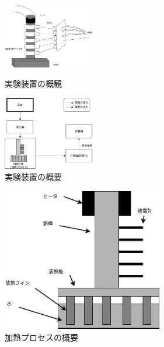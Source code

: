 \documentclass[12pt]{jsarticle}
\begin{document}
\begin{figure}[htbp]
 \begin{minipage}{0.5\hsize}
  \begin{center}
    \includegraphics[clip,width=4.0cm]{../Img/FigB1.eps}
  \end{center}
  \caption{実験装置の概観}
  \label{FigB1}
 \end{minipage}
 \begin{minipage}{0.5\hsize}
  \begin{center}
   \includegraphics[clip,width=4.0cm]{../Img/FigB2.eps}
  \end{center}
  \caption{実験装置の概要}
  \label{FigB2}
 \end{minipage}
\end{figure}

\begin{figure}[tb]
  \begin{center}
    \includegraphics[clip,width=7.0cm]{../Img/FigB3.eps}
    \caption{加熱プロセスの概要}
    \label{FigB3}
  \end{center}
\end{figure}
\end{document}
